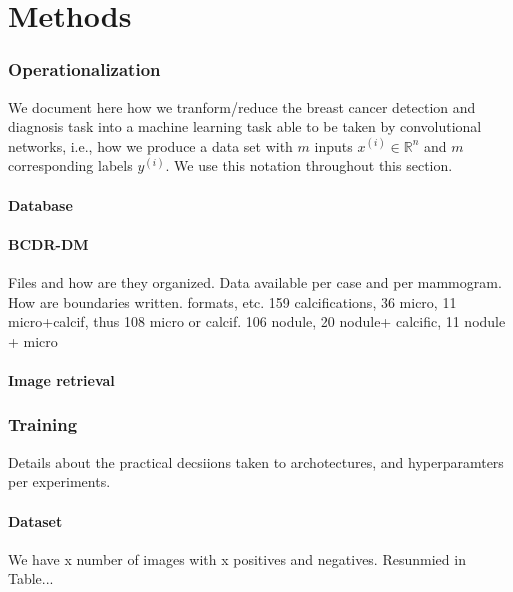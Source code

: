 \documentclass[11pt]{article}
\begin{document}
	\part{Methods}
	\section{Operationalization}
	We document here how we tranform/reduce the breast cancer detection and diagnosis task into a machine learning task able to be taken by convolutional networks, i.e., how we produce a data set with $m$ inputs $x^{(i)} \in \mathbb{R}^n$ and $m$ corresponding labels $y^{(i)}$. We use this notation throughout this section. 

	\subsection{Database}
	

	\subsection{BCDR-DM}
	Files and how are they organized. Data available per case and per mammogram. How are boundaries written. formats, etc.
	159 calcifications, 36 micro, 11 micro+calcif, thus 108 micro or calcif. 106 nodule, 20 nodule+ calcific, 11 nodule + micro

	\subsection{Image retrieval}
	



	\section{Training}
	Details about the practical decsiions taken to archotectures, and hyperparamters per experiments.

	\subsection{Dataset}
	We have x number of images with x positives and negatives. Resunmied in Table...
\end{document}
